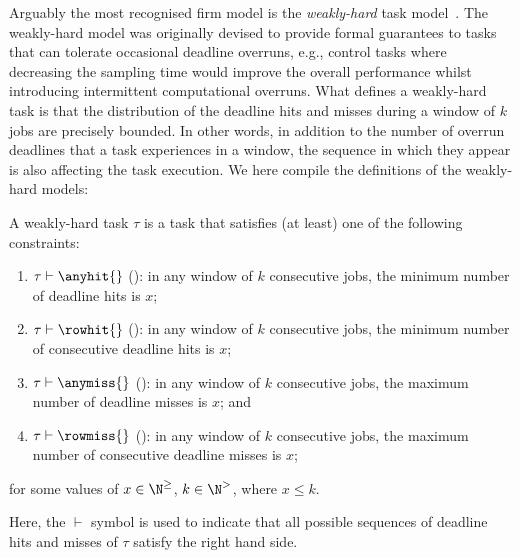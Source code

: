 Arguably the most recognised firm model is the \emph{weakly-hard} task model~\cite{Bernat:2001}.
The weakly-hard model was originally devised to provide formal guarantees to tasks that can tolerate occasional deadline overruns, e.g., control tasks where decreasing the sampling time would improve the overall performance whilst introducing intermittent computational overruns.
What defines a weakly-hard task is that the distribution of the deadline hits and misses during a window of $k$ jobs are precisely bounded.
In other words, in addition to the number of overrun deadlines that a task experiences in a window, the sequence in which they appear is also affecting the task execution.
We here compile the definitions of the weakly-hard models:
%
\begin{definition}%
\label{def:kappa:weakly-hard}%
    A weakly-hard task $\tau$ is a task that satisfies (at least) one of the following constraints:
    \begin{enumerate}[label=(\roman*)]
        \item \label{item:AnyHit} $\tau \vdash \anyhit{}$ (\tAH{}): in any window of $k$ consecutive jobs, the minimum number of deadline hits is $x$;
        \item \label{item:RowHit} $\tau \vdash \rowhit{}$ (\tRH{}): in any window of $k$ consecutive jobs, the minimum number of consecutive deadline hits is $x$;
        \item \label{item:AnyMiss} $\tau \vdash \anymiss{}$ (\tAM{}): in any window of $k$ consecutive jobs, the maximum number of deadline misses is $x$; and
        \item \label{item:RowMiss} $\tau \vdash \rowmiss{}$ (\tRM{}): in any window of $k$ consecutive jobs, the maximum number of consecutive deadline misses is $x$;
    \end{enumerate}
    for some values of $x\in \N^\geq$, $k \in \N^>$, where $x\leq k$.
\end{definition}
%
Here, the $\vdash$ symbol is used to indicate that all possible sequences of deadline hits and misses of $\tau$ satisfy the right hand side.

